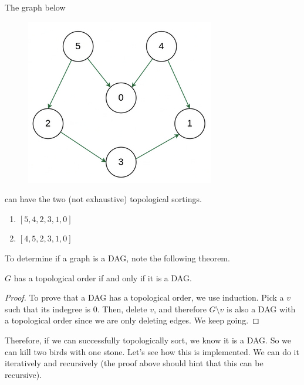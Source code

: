 \documentclass{article}
\begin{document}
    \begin{example}
      The graph below 
      \begin{figure}[H]
        \centering 
        \includegraphics[scale=0.55]{img/top_sort.png}
        \caption{} 
        \label{fig:top_sort}
      \end{figure}
      can have the two (not exhaustive) topological sortings. 
      \begin{enumerate}
        \item $[5, 4, 2, 3, 1, 0]$
        \item $[4, 5, 2, 3, 1, 0]$
      \end{enumerate}
    \end{example}

    To determine if a graph is a DAG, note the following theorem. 

    \begin{theorem}
      $G$ has a topological order if and only if it is a DAG. 
    \end{theorem}
    \begin{proof}
      To prove that a DAG has a topological order, we use induction. Pick a $v$ such that its indegree is $0$. Then, delete $v$, and therefore $G \setminus v$ is also a DAG with a topological order since we are only deleting edges. We keep going. 
    \end{proof}

    Therefore, if we can successfully topologically sort, we know it is a DAG. So we can kill two birds with one stone. Let's see how this is implemented. We can do it iteratively and recursively (the proof above should hint that this can be recursive). 
\end{document}
